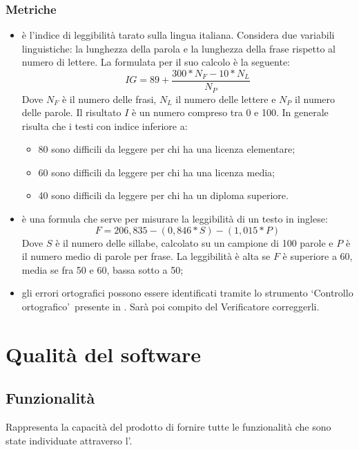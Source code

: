 \documentclass[PianoDiQualifica.tex]{subfiles}
\begin{document}
\subsubsection{Metriche}
\begin{itemize}
	\item {} è l'indice di leggibilità tarato sulla lingua italiana. Considera due variabili linguistiche: la lunghezza della parola e la lunghezza della frase rispetto al numero di lettere. La formulata per il suo calcolo è la seguente:
	\[IG=89+\dfrac{300*N_F-10*N_L}{N_P}\] Dove $ N_F $ è il numero delle frasi, $ N_L $ il numero delle lettere e $ N_P $ il numero delle parole. Il risultato $I$ è un numero compreso tra 0 e 100. In generale risulta che i testi con indice inferiore a:
	\begin{itemize}
		\item 80 sono difficili da leggere per chi ha una licenza elementare;
		\item 60 sono difficili da leggere per chi ha una licenza media;
		\item 40 sono difficili da leggere per chi ha un diploma superiore.
	\end{itemize}	
	\item {} è una formula che serve per misurare la leggibilità di un testo in inglese:
	\[F=206,835-(0,846*S)-(1,015*P)\] Dove $ S $ è il numero delle sillabe, calcolato su un campione di 100 parole e $ P $ è il numero medio di parole per frase.
	La leggibilità è alta se $F$ è superiore a 60, media se fra 50 e 60, bassa sotto a 50;
	\item {} gli errori ortografici possono essere identificati tramite lo strumento \textquoteleft Controllo ortografico\textquoteright\ presente in . Sarà poi compito del Verificatore correggerli.  	
\end{itemize}
		
\section{Qualità del software}
\subsection{Funzionalità}
Rappresenta la capacità del prodotto di fornire tutte le funzionalità che sono state individuate attraverso l'\adr.	
\end{document}
